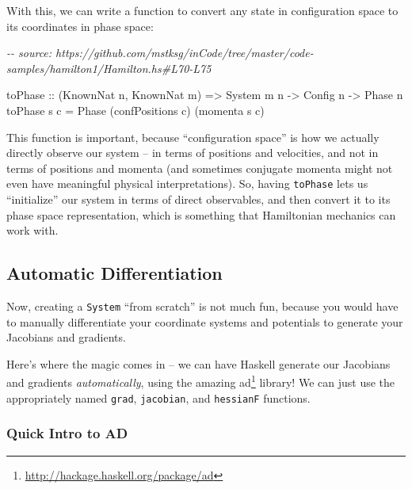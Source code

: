 \documentclass[]{article}
\newenvironment{Shaded}{}{}
\newcommand{\CommentTok}[1]{\textcolor[rgb]{0.38,0.63,0.69}{\textit{#1}}}
\newcommand{\DataTypeTok}[1]{\textcolor[rgb]{0.56,0.13,0.00}{#1}}
\newcommand{\NormalTok}[1]{#1}
\newcommand{\OtherTok}[1]{\textcolor[rgb]{0.00,0.44,0.13}{#1}}
\renewcommand{\href}[2]{#2\footnote{\url{#1}}}
\begin{document}
With this, we can write a function to convert any state in configuration space
to its coordinates in phase space:

\begin{Shaded}
\begin{Highlighting}[]
\CommentTok{{-}{-} source: https://github.com/mstksg/inCode/tree/master/code{-}samples/hamilton1/Hamilton.hs\#L70{-}L75}

\NormalTok{toPhase}
\OtherTok{    ::}\NormalTok{ (}\DataTypeTok{KnownNat}\NormalTok{ n, }\DataTypeTok{KnownNat}\NormalTok{ m)}
    \OtherTok{=\textgreater{}} \DataTypeTok{System}\NormalTok{ m n}
    \OtherTok{{-}\textgreater{}} \DataTypeTok{Config}\NormalTok{ n}
    \OtherTok{{-}\textgreater{}} \DataTypeTok{Phase}\NormalTok{ n}
\NormalTok{toPhase s c }\OtherTok{=} \DataTypeTok{Phase}\NormalTok{ (confPositions c) (momenta s c)}
\end{Highlighting}
\end{Shaded}

This function is important, because ``configuration space'' is how we actually
directly observe our system -- in terms of positions and velocities, and not in
terms of positions and momenta (and sometimes conjugate momenta might not even
have meaningful physical interpretations). So, having \texttt{toPhase} lets us
``initialize'' our system in terms of direct observables, and then convert it to
its phase space representation, which is something that Hamiltonian mechanics
can work with.

\subsection{Automatic Differentiation}\label{automatic-differentiation}

Now, creating a \texttt{System} ``from scratch'' is not much fun, because you
would have to manually differentiate your coordinate systems and potentials to
generate your Jacobians and gradients.

Here's where the magic comes in -- we can have Haskell generate our Jacobians
and gradients \emph{automatically}, using the amazing
\href{http://hackage.haskell.org/package/ad}{ad} library! We can just use the
appropriately named \texttt{grad}, \texttt{jacobian}, and \texttt{hessianF}
functions.

\subsubsection{Quick Intro to AD}\label{quick-intro-to-ad}
\end{document}
